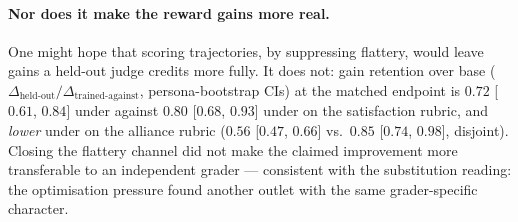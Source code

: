 \paragraph{Nor does it make the reward gains more real.} One might hope that scoring
trajectories, by suppressing flattery, would leave gains a held-out judge credits more fully.
It does not: gain retention over base
($\Delta_\text{held-out}/\Delta_\text{trained-against}$, persona-bootstrap CIs) at the matched
endpoint is $0.72$ [$0.61$, $0.84$] under \Kf{} against $0.80$ [$0.68$, $0.93$] under \Kz{} on
the satisfaction rubric, and \emph{lower} under \Kf{} on the alliance rubric ($0.56$
[$0.47$, $0.66$] vs.\ $0.85$ [$0.74$, $0.98$], disjoint). Closing the flattery channel did not
make the claimed improvement more transferable to an independent grader --- consistent with the
substitution reading: the optimisation pressure found another outlet with the same
grader-specific character.
